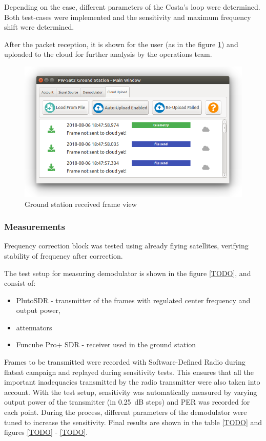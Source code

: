 Depending on the case, different parameters of the Costa's loop were determined. Both test-cases were implemented and the sensitivity and maximum frequency shift were determined.

After the packet reception, it is shown for the user (as in the figure \ref{gs_frame_view}) and uploaded to the cloud for further analysis by the operations team.

\begin{figure}[H]
    \centering
    \includegraphics[width=0.6\paperwidth]{img/5/gs_frame_view.png}
    \caption{Ground station received frame view}
    \label{gs_frame_view}
\end{figure}


\subsubsection{Measurements}
Frequency correction block was tested using already flying satellites, verifying stability of frequency after correction.

The test setup for measuring demodulator is shown in the figure \ref{TODO}, and consist of:
\begin{itemize}
    \item PlutoSDR - transmitter of the frames with regulated center frequency and output power,
    \item attenuators
    \item Funcube Pro+ SDR - receiver used in the ground station
\end{itemize}

Frames to be transmitted were recorded with Software-Defined Radio during flatsat campaign and replayed during sensitivity tests. This ensures that all the important inadequacies transmitted by the radio transmitter were also taken into account.
With the test setup, sensitivity was automatically measured by varying output power of the transmitter (in \SI{0.25}{\dB} steps) and PER was recorded for each point. During the process, different parameters of the demodulator were tuned to increase the sensitivity. Final results are shown in the table \ref{TODO} and figures \ref{TODO} - \ref{TODO}.
